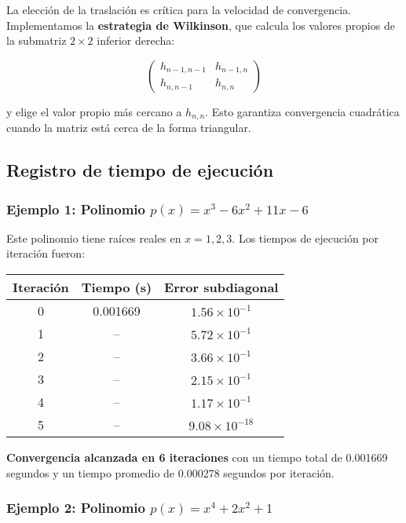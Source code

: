 \documentclass[12pt]{article}
\begin{document}
La elección de la traslación es crítica para la velocidad de convergencia. Implementamos la \textbf{estrategia de Wilkinson}, que calcula los valores propios de la submatriz $2 \times 2$ inferior derecha:

\[
\begin{pmatrix}
h_{n-1,n-1} & h_{n-1,n} \\
h_{n,n-1} & h_{n,n}
\end{pmatrix}
\]

y elige el valor propio más cercano a $h_{n,n}$. Esto garantiza convergencia cuadrática cuando la matriz está cerca de la forma triangular.

\subsection{Registro de tiempo de ejecución}

\subsubsection{Ejemplo 1: Polinomio $p(x) = x^3 - 6x^2 + 11x - 6$}

Este polinomio tiene raíces reales en $x = 1, 2, 3$. Los tiempos de ejecución por iteración fueron:

\begin{center}
\begin{tabular}{|c|c|c|}
\hline
\textbf{Iteración} & \textbf{Tiempo (s)} & \textbf{Error subdiagonal} \\
\hline
0 & 0.001669 & $1.56 \times 10^{-1}$ \\
1 & -- & $5.72 \times 10^{-1}$ \\
2 & -- & $3.66 \times 10^{-1}$ \\
3 & -- & $2.15 \times 10^{-1}$ \\
4 & -- & $1.17 \times 10^{-1}$ \\
5 & -- & $9.08 \times 10^{-18}$ \\
\hline
\end{tabular}
\end{center}

\textbf{Convergencia alcanzada en 6 iteraciones} con un tiempo total de 0.001669 segundos y un tiempo promedio de 0.000278 segundos por iteración.

\subsubsection{Ejemplo 2: Polinomio $p(x) = x^4 + 2x^2 + 1$}
\end{document}
